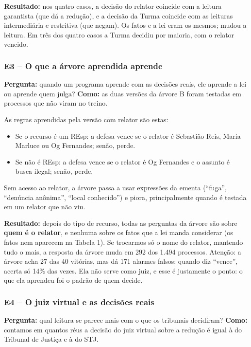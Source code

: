 \documentclass[11pt,a4paper]{article}
\begin{document}


\textbf{Resultado:} nos quatro casos, a decisão do relator coincide com a leitura
garantista (que dá a redução), e a decisão da Turma coincide com as leituras intermediária
e restritiva (que negam). Os fatos e a lei eram os mesmos; mudou a leitura. Em três dos
quatro casos a Turma decidiu por maioria, com o relator vencido.

\subsubsection*{E3 -- O que a árvore aprendida aprende}

\textbf{Pergunta:} quando um programa aprende com as decisões reais, ele aprende a lei ou
aprende quem julga?
\textbf{Como:} as duas versões da árvore B foram testadas em processos que não viram no
treino.



As regras aprendidas pela versão com relator são estas:
\begin{itemize}
  \item Se o recurso é um REsp: a defesa vence se o relator é Sebastião Reis, Maria Marluce
        ou Og Fernandes; senão, perde.
  \item Se não é REsp: a defesa vence se o relator é Og Fernandes e o assunto é busca
        ilegal; senão, perde.
\end{itemize}
Sem acesso ao relator, a árvore passa a usar expressões da ementa (``fuga'', ``denúncia
anônima'', ``local conhecido'') e piora, principalmente quando é testada em um relator
que não viu.

\textbf{Resultado:} depois do tipo de recurso, todas as perguntas da árvore são sobre
\textbf{quem é o relator}, e nenhuma sobre os fatos que a lei manda considerar (os fatos nem
aparecem na Tabela 1). Se trocarmos só o nome do relator, mantendo tudo o mais, a resposta
da árvore muda em 292 dos 1.494 processos. Atenção: a árvore acha 27 das 40 vitórias, mas
dá 171 alarmes falsos; quando diz ``vence'', acerta só 14\% das vezes. Ela não serve como
juiz, e esse é justamente o ponto: o que ela aprendeu foi o padrão de quem decide.

\subsubsection*{E4 -- O juiz virtual e as decisões reais}

\textbf{Pergunta:} qual leitura se parece mais com o que os tribunais decidiram?
\textbf{Como:} contamos em quantos réus a decisão do juiz virtual sobre a redução é igual
à do Tribunal de Justiça e à do STJ.
\end{document}
